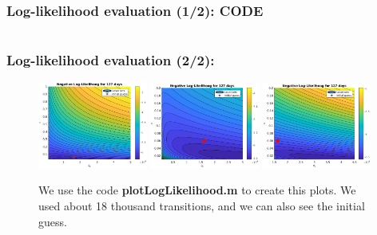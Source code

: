 \documentclass[aspectratio=169]{beamer}\usepackage[utf8]{inputenc}
\begin{document}
\begin{frame}\frametitle{Log-likelihood evaluation (1/2): CODE}

\begin{center}
\begin{tabular}{|c|}
\toprule
{\tiny

}\\
\bottomrule
\end{tabular}
\end{center}

\end{frame}


\begin{frame}\frametitle{Log-likelihood evaluation (2/2):}

\begin{figure}[ht!]
\centering
\includegraphics[width=0.32\textwidth]{../Results/likelihood/normal/Log-Likelihood.eps}
\includegraphics[width=0.32\textwidth]{../Results/likelihood/normal/Log-Likelihood_refined.eps}
\includegraphics[width=0.32\textwidth]{../Results/likelihood/normal/Log-Likelihood_more_refined.eps}
\caption{We use the code \textbf{plotLogLikelihood.m} to create this plots. We used about 18 thousand transitions, and we can also see the initial guess.}
\end{figure}

\end{frame}
\end{document}
